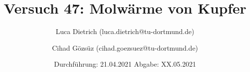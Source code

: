 

\subject{Fortgeschrittenenpraktikum der Fakultät Physik}
\title{Versuch 47: Molwärme von Kupfer}
\author{Luca Dietrich (luca.dietrich@tu-dortmund.de) \and Cihad Gözsüz (cihad.goezsuez@tu-dortmund.de)}
\date{%
  Durchführung: 21.04.2021
  \hspace{3em}
  Abgabe: XX.05.2021
}
\publishers{TU Dortmund – Fakultät Physik}


\maketitle
\thispagestyle{empty}
\tableofcontents
\newpage






\printbibliography{}


